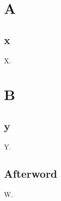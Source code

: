 \documentclass{svmono}
\begin{document}
\part{A}
\chapter{x}
X.
\part{B}
\chapter{y}
Y.
\backmatter
\chapter{Afterword}
W.
\end{document}

